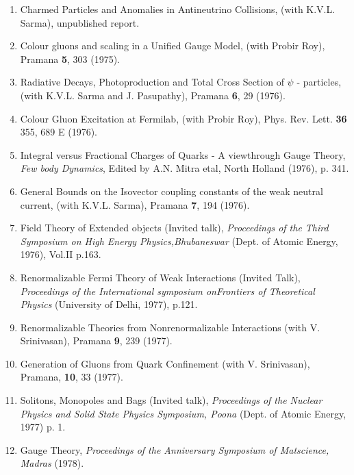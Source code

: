 \begin{enumerate}
\item Charmed Particles and Anomalies in Antineutrino Collisions, (with
K.V.L. Sarma), unpublished report. 

\item Colour gluons and scaling in a Unified Gauge Model, (with Probir
Roy), Pramana {\bf 5}, 303 (1975).

\item Radiative Decays, Photoproduction and Total Cross Section of
$\psi$ - particles, (with K.V.L. Sarma and J. Pasupathy), Pramana {\bf
6}, 29 (1976).

\item Colour Gluon Excitation at Fermilab, (with Probir Roy), Phys. Rev.
Lett. {\bf 36} 355, 689 E (1976).

\item Integral versus Fractional Charges of Quarks - A view\break  through Gauge Theory, {\em Few body Dynamics}, Edited by A.N. Mitra etal, North
Holland (1976), p. 341.

\item General Bounds on the Isovector coupling constants of the weak
neutral current, (with K.V.L. Sarma), Pramana {\bf 7}, 194 (1976).

\item Field Theory of Extended objects (Invited talk), {\it Procee\-dings of
the Third Symposium on High Energy Physics,\break Bhubaneswar} (Dept. of
Atomic Energy, 1976), Vol.II p.163.

\item Renormalizable Fermi Theory of Weak Interactions (Invited Talk), 
{\it Proceedings of the International symposium on\break Frontiers of Theoretical
Physics} (University of Delhi, 1977), p.121.

\item Renormalizable Theories from Nonrenormalizable Interactions (with
V. Srinivasan), Pramana {\bf 9}, 239 (1977).

\item Generation of Gluons from Quark Confinement (with V. Srinivasan), 
Pramana, {\bf 10}, 33 (1977).

\item Solitons, Monopoles and Bags (Invited talk), {\it Proceedings of the
Nuclear Physics and Solid State Physics Symposium, Poona} (Dept. of
Atomic Energy, 1977) p. 1.

\item Gauge Theory, {\it Proceedings of the Anniversary Symposium of
Matscience, Madras} (1978).


\end{enumerate}
